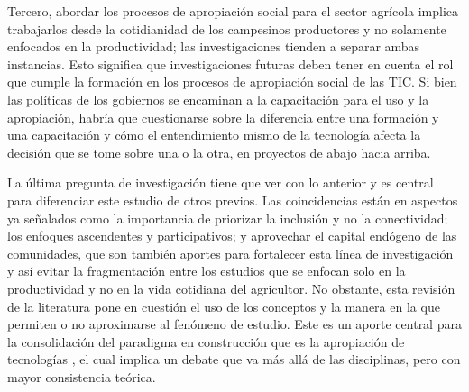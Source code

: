 \documentclass[spanish]{textolivre}
\begin{document}
Tercero, abordar los procesos de apropiación social para el sector agrícola implica trabajarlos desde la cotidianidad de los campesinos productores y no solamente enfocados en la productividad; las investigaciones tienden a separar ambas instancias. Esto significa que investigaciones futuras deben tener en cuenta el rol que cumple la formación en los procesos de apropiación social de las TIC. Si bien las políticas de los gobiernos se encaminan a la capacitación para el uso y la apropiación, habría que cuestionarse sobre la diferencia entre una formación y una capacitación y cómo el entendimiento mismo de la tecnología afecta la decisión que se tome sobre una o la otra, en proyectos de abajo hacia arriba. 

La última pregunta de investigación tiene que ver con lo anterior y es central para diferenciar este estudio de otros previos. Las coincidencias están en aspectos ya señalados como la importancia de priorizar la inclusión y no la conectividad; los enfoques ascendentes y participativos; y aprovechar el capital endógeno de las comunidades, que son también aportes para fortalecer esta línea de investigación y así evitar la fragmentación entre los estudios que se enfocan solo en la productividad y no en la vida cotidiana del agricultor. No obstante, esta revisión de la literatura pone en cuestión el uso de los conceptos y la manera en la que permiten o no aproximarse al fenómeno de estudio. Este es un aporte central para la consolidación del paradigma en construcción que es la apropiación de tecnologías \cite{morales_imaginacion_2017}, el cual implica un debate que va más allá de las disciplinas, pero con mayor consistencia teórica. 


\printbibliography\label{sec-bib}
\end{document}
